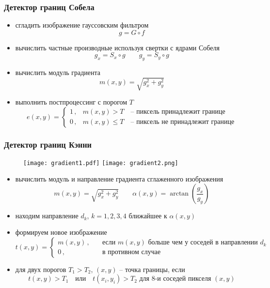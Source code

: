 \documentclass[
    12pt, 
    usepdftitle=false,
    aspectratio=1610
]{beamer}
\begin{document}
\begin{frame}
\frametitle{Детектор границ Собела}
\begin{itemize}
    \item сгладить изображение гауссовским фильтром
    $$
        g = G \circ f
    $$
    \item вычислить частные производные используя свертки с ядрами Собеля
    $$
        g_x=S_x\circ g
        \qquad
        g_y=S_y\circ g
    $$
    \item вычислить модуль градиента
    $$
        m(x,y) =\sqrt{g_x^2+g_y^2}
    $$
    \item выполнить постпроцессинг с порогом $T$
    $$
        e(x, y) =
        \begin{cases}
            1\,, & m(x,y) > T\quad \mbox{-- пиксель принадлежит границе}\\
            0\,, & m(x,y) \leqslant T\quad\mbox{-- пиксель не принадлежит границе}
        \end{cases}
    $$
\end{itemize}
\end{frame}


\begin{frame}
\frametitle{Детектор границ Кэнни}
\begin{figure}
    \centering
    \texttt{[image: gradient1.pdf]}
    \hspace{1cm}
    \texttt{[image: gradient2.png]}
\end{figure}
\begin{itemize}
    \item вычислить модуль и направление градиента сглаженного изображения
    $$
        m(x,y) =
            \sqrt{g_x^2+g_y^2}\qquad
            \alpha(x,y)=\arctan\left(\frac{g_x}{g_y}\right)
    $$
    \item находим направление $d_k$, $k=1,2,3,4$ ближайшее к $\alpha(x,y)$
    \item формируем новое изображение
    $$
        t(x, y) =
        \begin{cases}
            m(x,y)\,, & \quad \mbox{если}\,\, m(x,y)\,\,\mbox{больше чем у соседей в направлении}\,\,d_k\\
            0\,, & \quad\mbox{в противном случае}
        \end{cases}
    $$
    \item для двух порогов $T_1>T_2$, $(x,y)$ -- точка границы, если
    $$
        t(x,y) > T_1
        \quad\mbox{или}\quad
        t(x_i, y_i) > T_2\,\,
        \mbox{для 8-и соседей пикселя}\,\, (x,y)
    $$
\end{itemize}
\end{frame}
\end{document}

